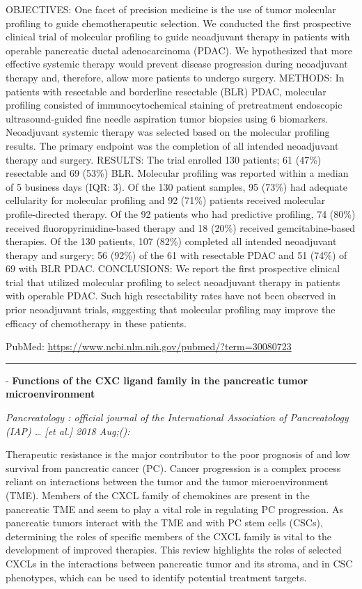 \documentclass[]{article}
\begin{document}
OBJECTIVES: One facet of precision medicine is the use of tumor
molecular profiling to guide chemotherapeutic selection. We conducted
the first prospective clinical trial of molecular profiling to guide
neoadjuvant therapy in patients with operable pancreatic ductal
adenocarcinoma (PDAC). We hypothesized that more effective systemic
therapy would prevent disease progression during neoadjuvant therapy
and, therefore, allow more patients to undergo surgery. METHODS: In
patients with resectable and borderline resectable (BLR) PDAC, molecular
profiling consisted of immunocytochemical staining of pretreatment
endoscopic ultrasound-guided fine needle aspiration tumor biopsies using
6 biomarkers. Neoadjuvant systemic therapy was selected based on the
molecular profiling results. The primary endpoint was the completion of
all intended neoadjuvant therapy and surgery. RESULTS: The trial
enrolled 130 patients; 61 (47\%) resectable and 69 (53\%) BLR. Molecular
profiling was reported within a median of 5 business days (IQR: 3). Of
the 130 patient samples, 95 (73\%) had adequate cellularity for
molecular profiling and 92 (71\%) patients received molecular
profile-directed therapy. Of the 92 patients who had predictive
profiling, 74 (80\%) received fluoropyrimidine-based therapy and 18
(20\%) received gemcitabine-based therapies. Of the 130 patients, 107
(82\%) completed all intended neoadjuvant therapy and surgery; 56 (92\%)
of the 61 with resectable PDAC and 51 (74\%) of 69 with BLR PDAC.
CONCLUSIONS: We report the first prospective clinical trial that
utilized molecular profiling to select neoadjuvant therapy in patients
with operable PDAC. Such high resectability rates have not been observed
in prior neoadjuvant trials, suggesting that molecular profiling may
improve the efficacy of chemotherapy in these patients.

PubMed: \url{https://www.ncbi.nlm.nih.gov/pubmed/?term=30080723}

{}

{}

\begin{center}\rule{0.5\linewidth}{\linethickness}\end{center}

 - \textbf{Functions of the CXC ligand family in the pancreatic tumor
microenvironment}

\emph{Pancreatology : official journal of the International Association
of Pancreatology (IAP) \ldots{} {[}et al.{]} 2018 Aug;():}

Therapeutic resistance is the major contributor to the poor prognosis of
and low survival from pancreatic cancer (PC). Cancer progression is a
complex process reliant on interactions between the tumor and the tumor
microenvironment (TME). Members of the CXCL family of chemokines are
present in the pancreatic TME and seem to play a vital role in
regulating PC progression. As pancreatic tumors interact with the TME
and with PC stem cells (CSCs), determining the roles of specific members
of the CXCL family is vital to the development of improved therapies.
This review highlights the roles of selected CXCLs in the interactions
between pancreatic tumor and its stroma, and in CSC phenotypes, which
can be used to identify potential treatment targets.
\end{document}
